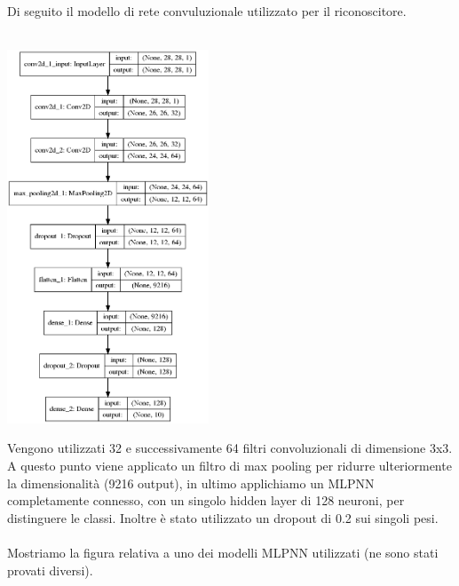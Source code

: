 \documentclass[12pt]{article}
\begin{document}
\begin{multicols}{2}
    Di seguito il modello di rete convuluzionale utilizzato per il riconoscitore.\\\\

    \bigskip
    \noindent
    \begin{minipage}{\linewidth}
        \centering
        \includegraphics[width=6cm]{../mnist_models/CNN2D_type0-batch128/model.png}
        \label{fig:cc}
    \end{minipage}
    \bigskip

    Vengono utilizzati 32 e successivamente 64 filtri convoluzionali di dimensione 3x3.
    A questo punto viene applicato un filtro di max pooling per ridurre ulteriormente
    la dimensionalità (9216 output), in ultimo applichiamo
    un MLPNN completamente connesso, con un singolo hidden layer di 128 neuroni,
     per distinguere le classi. Inoltre è stato utilizzato
    un dropout di 0.2 sui singoli pesi.\\\\Mostriamo la figura relativa a uno dei 
    modelli MLPNN utilizzati (ne sono stati provati diversi).


\end{multicols}
\end{document}
